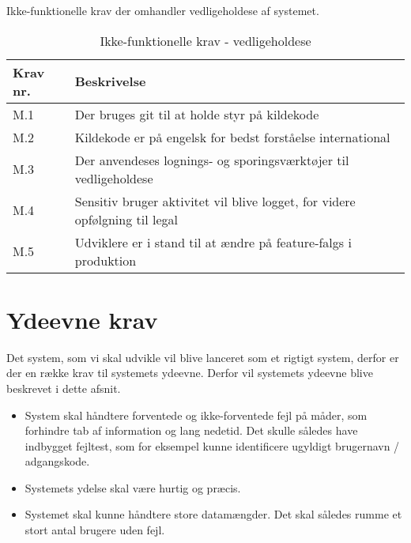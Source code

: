 Ikke-funktionelle krav der omhandler vedligeholdese af systemet.

\begin{table}[H]
    \centering
    \caption{Ikke-funktionelle krav - vedligeholdese}
    \label{tab:if-maintenance}
    \begin{tabular}{l|l}
        \textbf{Krav nr.} & \textbf{Beskrivelse}                                                                                                               \\\hline
        M.1               & \multicolumn{1}{p{8cm}}{Der bruges git til at holde styr på kildekode} \\\hline
        M.2               & \multicolumn{1}{p{8cm}}{Kildekode er på engelsk for bedst forståelse international} \\\hline
        M.3               & \multicolumn{1}{p{8cm}}{Der anvendeses lognings- og sporingsværktøjer til vedligeholdese} \\\hline
        M.4               & \multicolumn{1}{p{8cm}}{Sensitiv bruger aktivitet vil blive logget, for videre opfølgning til legal} \\\hline
        M.5               & \multicolumn{1}{p{8cm}}{Udviklere er i stand til at ændre på feature-falgs i produktion} \\\hline
    \end{tabular}
\end{table}

\section{Ydeevne krav}
Det system, som vi skal udvikle vil blive lanceret som et rigtigt system, derfor er der en række krav til systemets ydeevne. Derfor vil systemets ydeevne blive beskrevet i dette afsnit.   
\begin{itemize}  
     \item System skal håndtere forventede og ikke-forventede fejl på måder, som forhindre tab af information og lang nedetid. Det skulle således have indbygget fejltest, som for eksempel kunne identificere ugyldigt brugernavn / adgangskode.
     \item Systemets ydelse skal være hurtig og præcis.
     \item Systemet skal kunne håndtere store datamængder. Det skal således rumme et stort antal brugere uden fejl.
\end{itemize}

